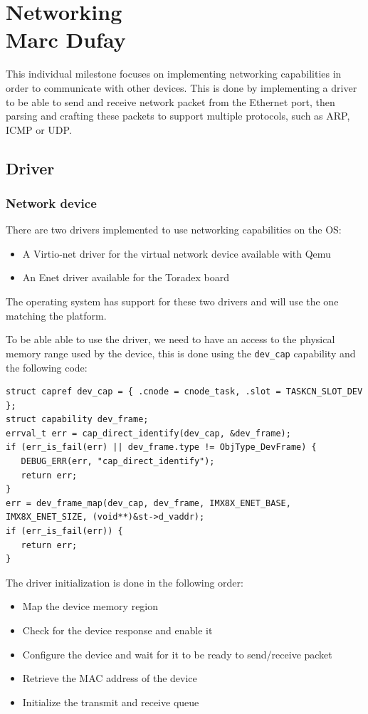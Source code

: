 \chapter[Networking]{Networking \\ \Large \textnormal{Marc Dufay}}

This individual milestone focuses on implementing networking capabilities in order to communicate with other devices. This is done by implementing a driver to be able to send and receive network packet from the Ethernet port, then parsing and crafting these packets to support multiple protocols, such as ARP, ICMP or UDP.

\section{Driver}

\subsection{Network device}

There are two drivers implemented to use networking capabilities on the OS:
\begin{itemize}
\item A Virtio-net driver for the virtual network device available with Qemu
\item An Enet driver available for the Toradex board
\end{itemize}

The operating system has support for these two drivers and will use the one matching the platform.

To be able able to use the driver, we need to have an access to the physical memory range used by the device, this is done using the \verb|dev_cap| capability and the following code:

\begin{lstlisting}
struct capref dev_cap = { .cnode = cnode_task, .slot = TASKCN_SLOT_DEV };
struct capability dev_frame;
errval_t err = cap_direct_identify(dev_cap, &dev_frame);
if (err_is_fail(err) || dev_frame.type != ObjType_DevFrame) {
   DEBUG_ERR(err, "cap_direct_identify");
   return err;
}
err = dev_frame_map(dev_cap, dev_frame, IMX8X_ENET_BASE, IMX8X_ENET_SIZE, (void**)&st->d_vaddr);
if (err_is_fail(err)) {
   return err;
}
\end{lstlisting}

The driver initialization is done in the following order:
\begin{itemize}
\item Map the device memory region
\item Check for the device response and enable it
\item Configure the device and wait for it to be ready to send/receive packet
\item Retrieve the MAC address of the device
\item Initialize the transmit and receive queue
\end{itemize}

